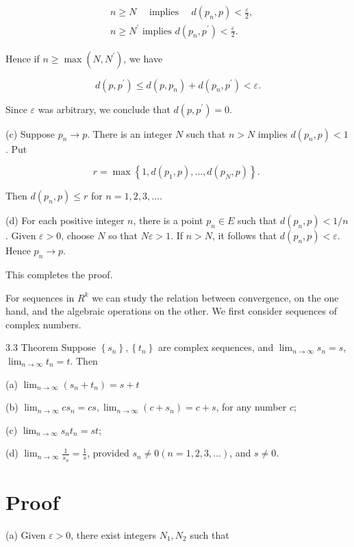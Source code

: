 \documentclass[10pt]{article}
\begin{document}
$$
\begin{aligned}
& n \geq N \quad \text { implies } \quad d\left(p_{n}, p\right)<\frac{\varepsilon}{2}, \\
& n \geq N^{\prime} \text { implies } d\left(p_{n}, p^{\prime}\right)<\frac{\varepsilon}{2} .
\end{aligned}
$$

Hence if $n \geq \max \left(N, N^{\prime}\right)$, we have

$$
d\left(p, p^{\prime}\right) \leq d\left(p, p_{n}\right)+d\left(p_{n}, p^{\prime}\right)<\varepsilon .
$$

Since $\varepsilon$ was arbitrary, we conclude that $d\left(p, p^{\prime}\right)=0$.

(c) Suppose $p_{n} \rightarrow p$. There is an integer $N$ such that $n>N$ implies $d\left(p_{n}, p\right)<1$. Put

$$
r=\max \left\{1, d\left(p_{1}, p\right), \ldots, d\left(p_{N}, p\right)\right\} \text {. }
$$

Then $d\left(p_{n}, p\right) \leq r$ for $n=1,2,3, \ldots$.

(d) For each positive integer $n$, there is a point $p_{n} \in E$ such that $d\left(p_{n}, p\right)<1 / n$. Given $\varepsilon>0$, choose $N$ so that $N \varepsilon>1$. If $n>N$, it follows that $d\left(p_{n}, p\right)<\varepsilon$. Hence $p_{n} \rightarrow p$.

This completes the proof.

For sequences in $R^{k}$ we can study the relation between convergence, on the one hand, and the algebraic operations on the other. We first consider sequences of complex numbers.

3.3 Theorem Suppose $\left\{s_{n}\right\},\left\{t_{n}\right\}$ are complex sequences, and $\lim _{n \rightarrow \infty} s_{n}=s$, $\lim _{n \rightarrow \infty} t_{n}=t$. Then

(a) $\lim _{n \rightarrow \infty}\left(s_{n}+t_{n}\right)=s+t$

(b) $\lim _{n \rightarrow \infty} c s_{n}=c s, \lim _{n \rightarrow \infty}\left(c+s_{n}\right)=c+s$, for any number $c$;

(c) $\lim _{n \rightarrow \infty} s_{n} t_{n}=s t$;

(d) $\lim _{n \rightarrow \infty} \frac{1}{s_{n}}=\frac{1}{s}$, provided $s_{n} \neq 0(n=1,2,3, \ldots)$, and $s \neq 0$.

\section{Proof}
(a) Given $\varepsilon>0$, there exist integers $N_{1}, N_{2}$ such that
\end{document}
